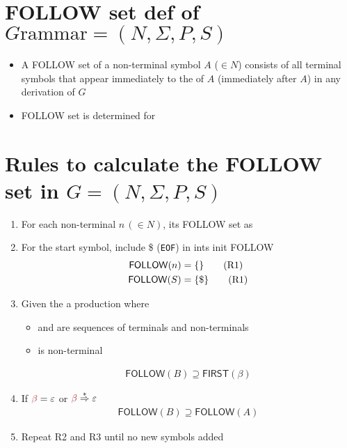 \documentclass[10pt,a4paper,landscape]{article}
\begin{document}
\begin{multicols*}{3}
\section*{FOLLOW set def of $G\text{rammar}=(N,\Sigma, P, S)$}
\begin{itemize}
\item A \textsf{FOLLOW} set of a non-terminal symbol $A$ ($\in N$) consists of all terminal symbols that appear immediately to the  of $A$ (immediately after $A$) in any derivation of $G$
\item \textsf{FOLLOW} set is determined for 
\end{itemize}
\section*{Rules to calculate the FOLLOW set in $G=(N,\Sigma, P, S)$}
\begin{enumerate}
\item For each non-terminal $n\,(\in N)$,  its \textsf{FOLLOW} set as \mset{}
\item[] For the start symbol, include \$ (\texttt{EOF}) in ints init \textsf{FOLLOW}
  \begin{align*}
    \mathsf{FOLLOW}(n) &= \{\}  \tag{R1} \\
    \mathsf{FOLLOW}(S) &= \{\$\} \tag{R1}
  \end{align*}
\item Given the a production  where
  \begin{itemize}
  \item \mo{$\alpha$} and \mo{$\beta$} are sequences of terminals and non-terminals
  \item {} is non-terminal
  \end{itemize}
  \begin{align*}
    \mathsf{FOLLOW}(B) \supseteq \mathsf{FIRST}(\beta) \tag{R2}
  \end{align*}
\item If $\mo{\beta} = \varepsilon$ or $\mo{\beta} \overset{\ast}{\Rightarrow}\varepsilon$
  \begin{align*}
    \mathsf{FOLLOW}(B) \supseteq \mathsf{FOLLOW}(A) \tag{R3}
  \end{align*}
\item Repeat R2 and R3 until no new symbols added
\end{enumerate}

\end{multicols*}
\end{document}
